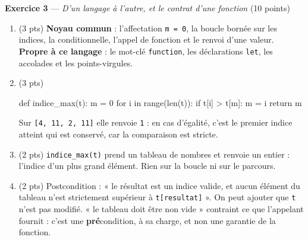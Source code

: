 \bigskip

\textbf{Exercice 3} --- \textit{D'un langage à l'autre, et le contrat d'une fonction} \hfill (10 points)

\begin{enumerate}
  \item (3 pts) \textbf{Noyau commun} : l'affectation \lstinline{m = 0}, la boucle bornée sur
        les indices, la conditionnelle, l'appel de fonction et le renvoi d'une valeur.
        \textbf{Propre à ce langage} : le mot-clé \lstinline{function}, les déclarations
        \lstinline{let}, les accolades et les points-virgules.
  \item (3 pts)
        \begin{python}
def indice_max(t):
    m = 0
    for i in range(len(t)):
        if t[i] > t[m]:
            m = i
    return m
        \end{python}
        Sur \lstinline{[4, 11, 2, 11]} elle renvoie \lstinline{1} : en cas d'égalité, c'est le
        premier indice atteint qui est conservé, car la comparaison est stricte.
  \item (2 pts) \lstinline{indice_max(t)} prend un tableau de nombres et renvoie un entier :
        l'indice d'un plus grand élément. Rien sur la boucle ni sur le parcours.
  \item (2 pts) Postcondition : « le résultat est un indice valide, et aucun élément du tableau
        n'est strictement supérieur à \lstinline{t[resultat]} ». On peut ajouter que
        \lstinline{t} n'est pas modifié.
        « le tableau doit être non vide » contraint ce que l'appelant fournit : c'est une
        \textbf{pré}condition, à sa charge, et non une garantie de la fonction.
\end{enumerate}
